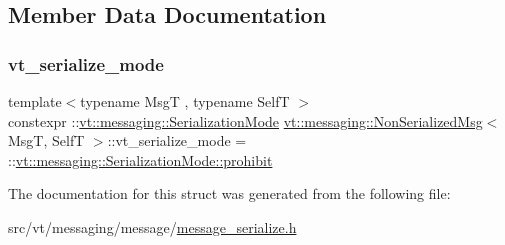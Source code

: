 \subsection{Member Data Documentation}
\mbox{\label{structvt_1_1messaging_1_1_non_serialized_msg_a51b31c1f6eab5950f3586559c5d27f8a}} 
\subsubsection{\texorpdfstring{vt\+\_\+serialize\+\_\+mode}{vt\_serialize\_mode}}
{\footnotesize\ttfamily template$<$typename MsgT , typename SelfT $>$ \\
constexpr \+::\hyperlink{namespacevt_1_1messaging_a436c5b9fc7f591e5978a136999cb9ef8}{vt\+::messaging\+::\+Serialization\+Mode} \hyperlink{structvt_1_1messaging_1_1_non_serialized_msg}{vt\+::messaging\+::\+Non\+Serialized\+Msg}$<$ MsgT, SelfT $>$\+::vt\+\_\+serialize\+\_\+mode = \+::\hyperlink{namespacevt_1_1messaging_a436c5b9fc7f591e5978a136999cb9ef8abc56ee21f7c9d61984fde885e8ce116f}{vt\+::messaging\+::\+Serialization\+Mode\+::prohibit}\hspace{0.3cm}{\ttfamily [static]}}



The documentation for this struct was generated from the following file\+:\begin{DoxyCompactItemize}
\item 
src/vt/messaging/message/\hyperlink{message__serialize_8h}{message\+\_\+serialize.\+h}\end{DoxyCompactItemize}
